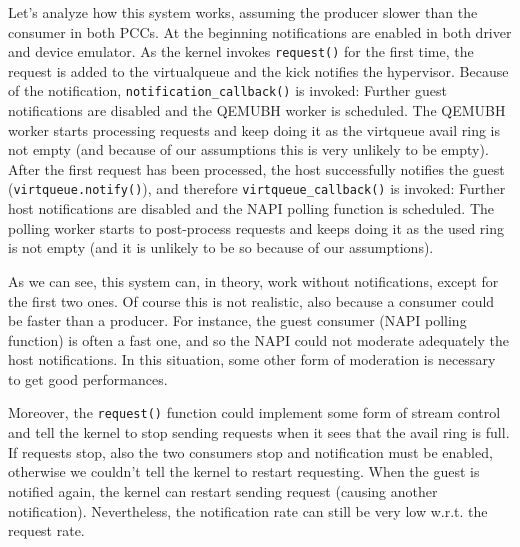 \vspace{0.5cm}

Let's analyze how this system works, assuming the producer slower than the consumer in both PCCs. At the beginning notifications are 
enabled in both driver and device emulator. As the kernel invokes \texttt{request()} for the first time, the request is added to the 
virtualqueue and the kick notifies the hypervisor. Because of the
notification, \texttt{notification\_callback()} is invoked: Further guest notifications are disabled and the QEMUBH worker is
scheduled. The QEMUBH worker starts processing requests and keep doing it as the virtqueue avail ring is not empty (and because of our 
assumptions this is very unlikely to be empty). After the first request has been processed, the host successfully notifies the guest 
(\texttt{virtqueue.notify()}), and therefore \texttt{virtqueue\_callback()} is invoked: Further host notifications are disabled and the
NAPI polling function is scheduled. The polling worker starts to post-process requests and keeps doing it as the used ring is not empty 
(and it is unlikely to be so because of our assumptions). 

\vspace{0.5cm}

As we can see, this system can, in theory, work without notifications, except for the first two ones. Of course this is not realistic, also
because a consumer could be faster than a producer. For instance, the guest consumer (NAPI polling function) is often a fast one, and
so the NAPI could not moderate adequately the host notifications. In this situation, some other form of moderation is necessary to get
good performances.

Moreover, the \texttt{request()} function could implement some form of stream control and tell the kernel to stop sending requests when it
sees that the avail ring is full. If requests stop, also the two consumers stop and notification must be enabled, otherwise we couldn't
tell the kernel to restart requesting. When the guest is notified again, the kernel can restart sending request 
(causing another notification). Nevertheless, the notification rate can still be very low w.r.t. the request rate.


